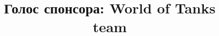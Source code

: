 \documentclass[10pt, a5paper]{article}
\begin{document}
\title{Голос спонсора: World of Tanks team}
\date{}
\maketitle

~
\end{document}

